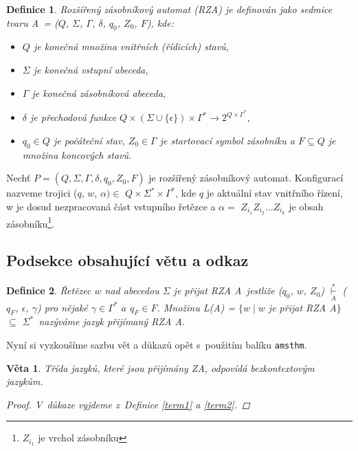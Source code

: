 \documentclass[a4paper, 11pt, twocolumn]{article}
\newtheorem{theorem}{Definice}
\newtheorem{veta}{Věta}
\begin{document}
\begin{theorem}\label{ref1}
\textnormal{Rozšířený zásobníkový automat} \textit{(RZA)} je de\-finován jako sedmice tvaru A~= ($Q$, $\Sigma$, $\Gamma$, $\delta$, $q_{0}$, $Z_{0}$, $F$), kde:
 \begin{itemize}
  \item  $Q$ je konečná množina \textnormal{vnitřních (řídicích) stavů,}
  \item  $\Sigma$ je konečná \textnormal{vstupní abeceda,}
  \item  $\Gamma$ je konečná \textnormal{zásobníková abeceda,}
  \item  $\delta$ je \textnormal{přechodová funkce} $Q \times(\Sigma \cup\{\epsilon\}) \times \Gamma^{*} \rightarrow 2^{Q \times \Gamma^{*}}$,
  \item $q_{0} \in Q$ je \textnormal{počáteční stav,} $Z_{0} \in \Gamma$ je \textnormal{startovací symbol
zásobníku} a $F \subseteq Q$ je množina \textnormal{koncových stavů.}
\end{itemize}
\end{theorem}


\par Nechť $P=\left (Q, \Sigma, \Gamma, \delta, q_{0}, Z_{0}, F\right)$ je rozšířený zásobníkový automat.
Konfigurací nazveme trojici ($q$, $w$, $\alpha)\in$ $Q \times \Sigma^{*} \times \Gamma^{*}$, kde $q$ je aktuální 
stav vnitřního řízení, w je dosud nezpracovaná část vstupního řetězce a $\alpha=$ $Z_{i_{1}} Z_{i_{2}} \ldots
Z_{i_{k}}$ je obsah  
zásobníku\footnote{$Z_{i_{1}}$ je vrchol zásobníku}.

\subsection{Podsekce obsahující větu a odkaz}
\begin{theorem}
\textnormal{Řetězec $w$ nad abecedou $\Sigma$ je přijat RZA}
A~jestliže ($q_{0}$, $w$, $Z_{0}$) $\overset{*}{\underset{A}{\vdash}}$ ($q_{F}$, $\epsilon$, $\gamma$) pro nějaké $\gamma \in \Gamma^{*}$ $a$ $q_{F} \in F$.
Množinu L(A) = $\{w \mid w$ je přijat \textit{RZA A}$\}$\- $\subseteq$  $\Sigma^{*}$~nazýváme \textnormal{jazyk přijímaný RZA} A.
\end{theorem}

\textnormal{Nyní si vyzkoušíme sazbu vět a důkazů opět s~použitím
balíku} \verb|amsthm|.
\begin{veta}
Třída jazyků, které jsou přijímány ZA, odpovídá
\textnormal{bezkontextovým jazykům.}
\begin{proof}
V~důkaze vyjdeme z~Definice \ref{term1} a \ref{term2}.
\end{proof}
\end{veta}
\end{document}
